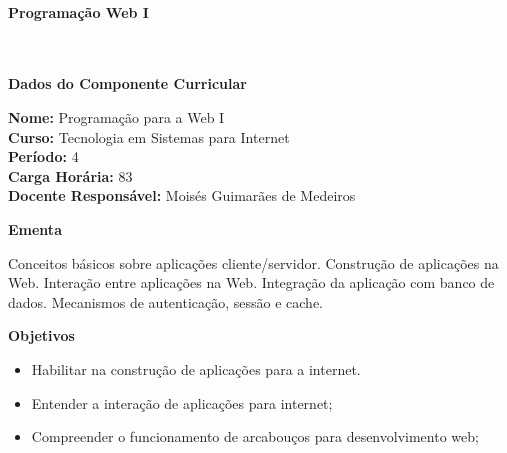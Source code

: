 \paragraph{Programação Web I} \


\begin{snugshade}\begin{center}\textbf{
    Dados do Componente Curricular
}\end{center}\end{snugshade}

\noindent \textbf{Nome:}                Programação para a Web I
\\        \textbf{Curso:}               Tecnologia em Sistemas para Internet
\\        \textbf{Período:}             \unit{4}{\degree}
\\        \textbf{Carga Horária:}       \unit{83}{\hour}
\\        \textbf{Docente Responsável:} Moisés Guimarães de Medeiros


\begin{snugshade}\begin{center}\textbf{
    Ementa
\vphantom{q}}\end{center}\end{snugshade}

\noindent
Conceitos básicos sobre aplicações cliente/servidor. Construção de aplicações na Web. Interação entre aplicações na Web. Integração da aplicação com banco de dados. Mecanismos de autenticação, sessão e cache. 

\begin{snugshade}\begin{center}\textbf{
    Objetivos
}\end{center}\end{snugshade}

\begin{itemize}

\item Habilitar na construção de aplicações para a internet.

\item Entender a interação de aplicações para internet;

\item Compreender o funcionamento de arcabouços para desenvolvimento web;

\end{itemize} 

